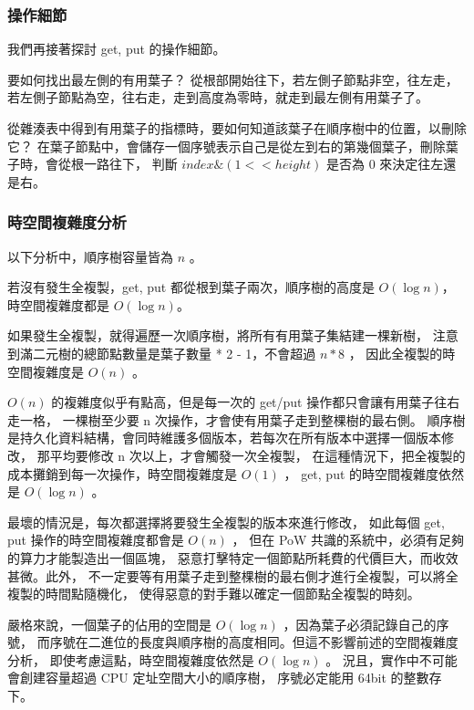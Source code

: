 \subsubsection{操作細節}

我們再接著探討 get, put 的操作細節。

要如何找出最左側的有用葉子？
從根部開始往下，若左側子節點非空，往左走，若左側子節點為空，往右走，走到高度為零時，就走到最左側有用葉子了。

從雜湊表中得到有用葉子的指標時，要如何知道該葉子在順序樹中的位置，以刪除它？
在葉子節點中，會儲存一個序號表示自己是從左到右的第幾個葉子，刪除葉子時，會從根一路往下，
判斷 $index \& (1 << height)$ 是否為 0 來決定往左還是右。

\subsubsection{時空間複雜度分析}

以下分析中，順序樹容量皆為 $n$ 。

若沒有發生全複製，get, put 都從根到葉子兩次，順序樹的高度是 $O(\log n)$，
時空間複雜度都是 $O(\log n)$。

如果發生全複製，就得遍歷一次順序樹，將所有有用葉子集結建一棵新樹，
注意到滿二元樹的總節點數量是葉子數量 * 2 - 1，不會超過 $n * 8$ ，
因此全複製的時空間複雜度是 $O(n)$ 。

$O(n)$ 的複雜度似乎有點高，但是每一次的 get/put 操作都只會讓有用葉子往右走一格，
一棵樹至少要 n 次操作，才會使有用葉子走到整棵樹的最右側。
順序樹是持久化資料結構，會同時維護多個版本，若每次在所有版本中選擇一個版本修改，
那平均要修改 n 次以上，才會觸發一次全複製，
在這種情況下，把全複製的成本攤銷到每一次操作，時空間複雜度是 $O(1)$ ，
get, put 的時空間複雜度依然是 $O(\log n)$ 。

最壞的情況是，每次都選擇將要發生全複製的版本來進行修改，
如此每個 get, put 操作的時空間複雜度都會是 $O(n)$ ，
但在 PoW 共識的系統中，必須有足夠的算力才能製造出一個區塊，
惡意打擊特定一個節點所耗費的代價巨大，而收效甚微。此外，
不一定要等有用葉子走到整棵樹的最右側才進行全複製，可以將全複製的時間點隨機化，
使得惡意的對手難以確定一個節點全複製的時刻。

嚴格來說，一個葉子的佔用的空間是 $O(\log n)$ ，因為葉子必須記錄自己的序號，
而序號在二進位的長度與順序樹的高度相同。但這不影響前述的空間複雜度分析，
即使考慮這點，時空間複雜度依然是 $O(\log n)$ 。
況且，實作中不可能會創建容量超過 CPU 定址空間大小的順序樹，
序號必定能用 64bit 的整數存下。